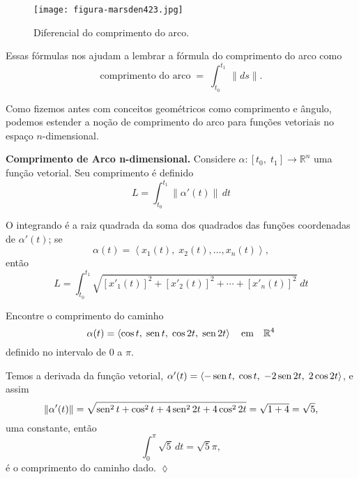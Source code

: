 \begin{figure}[H]
  \centering
  \texttt{[image: figura-marsden423.jpg]}
  \caption{Diferencial do comprimento do arco.}\label{fig:4-2-3}
\end{figure}

Essas fórmulas nos ajudam a lembrar a fórmula do comprimento do arco como
\begin{equation*}
\boxed{\quad   \text{comprimento do arco}\; = \; \int_{t_{0}}^{t_{1}}\,\|ds\|. \quad}
\end{equation*}

Como fizemos antes com conceitos geométricos como comprimento e ângulo, podemos estender a noção de comprimento do arco para funções vetoriais no espaço \(n\)-dimensional.

\bigskip
\noindent\textbf{Comprimento de Arco n-dimensional.}
Considere \(\alpha\colon [t_{0},\; t_{1}] \to \mathbb{R}^{n}\) uma função vetorial. Seu comprimento é definido
\begin{equation*}
  L=\int_{t_{0}}^{t_{1}}\|\alpha'(t)\|\,dt
\end{equation*}

O integrando é a raiz quadrada da soma dos quadrados das funções coordenadas de \(\alpha'(t)\); se
\begin{equation*}
\alpha(t) = \left\langle x_{1}(t),\;x_{2}(t), \ldots, x_{n}(t) \right\rangle,
\end{equation*}
então
\begin{equation*}
L=\int_{t_{0}}^{t_{1}}\sqrt{[x'_{1}(t)]^{2}+[x'_{2}(t)]^{2}+\cdots+[x'_{n}(t)]^{2}}\;dt
\end{equation*}

\begin{exc}
Encontre o comprimento do caminho
\begin{equation*}
\alpha(t) = \left\langle\cos t,\; \operatorname{sen} t,\; \cos 2t,\; \operatorname{sen} 2t\right\rangle\quad \text{em}\quad \mathbb{R}^{4}
\end{equation*}
definido no intervalo de \(0\) a \(\pi\).
\end{exc}

\solo
Temos a derivada da função vetorial,  \(\alpha'(t) =\langle -\operatorname{sen} t,\; \cos t,\; -2 \operatorname{sen} 2t, \; 2 \cos 2t \rangle\), e assim
\begin{equation*}
\|\alpha'(t)\| = \sqrt{\operatorname{sen}^{2} t + \cos^{2} t + 4 \operatorname{sen}^{2} 2t + 4 \cos^{2} 2t} =  \sqrt{1+4} = \sqrt{5},
\end{equation*}
uma constante, então
\begin{equation*}
\int_{0}^{\pi}\sqrt{5} \, dt = \sqrt{5}\pi,
\end{equation*}
é o comprimento do caminho dado. \hfill $\lozenge$

